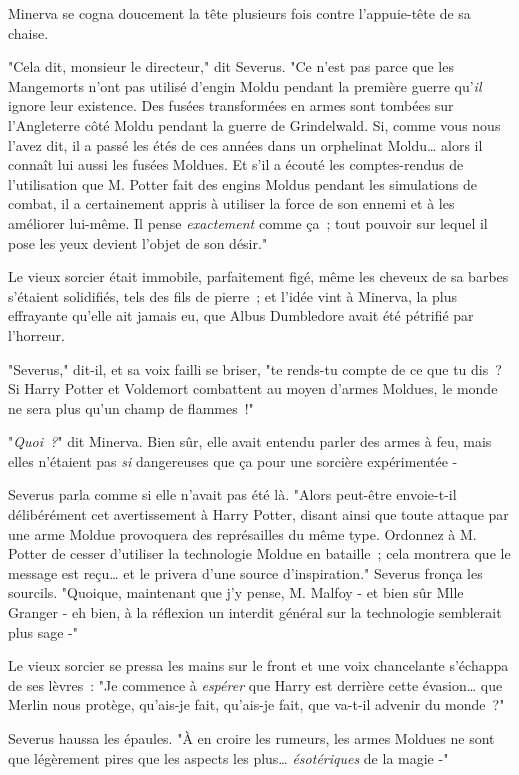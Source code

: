 Minerva se cogna doucement la tête plusieurs fois contre l'appuie-tête de sa chaise.

"Cela dit, monsieur le directeur," dit Severus. "Ce n'est pas parce que les Mangemorts n'ont pas utilisé d'engin Moldu pendant la première guerre qu'\emph{il} ignore leur existence. Des fusées transformées en armes sont tombées sur l'Angleterre côté Moldu pendant la guerre de Grindelwald. Si, comme vous nous l'avez dit, il a passé les étés de ces années dans un orphelinat Moldu… alors il connaît lui aussi les fusées Moldues. Et s'il a écouté les comptes-rendus de l'utilisation que M. Potter fait des engins Moldus pendant les simulations de combat, il a certainement appris à utiliser la force de son ennemi et à les améliorer lui-même. Il pense \emph{exactement} comme ça~; tout pouvoir sur lequel il pose les yeux devient l'objet de son désir."

Le vieux sorcier était immobile, parfaitement figé, même les cheveux de sa barbes s'étaient solidifiés, tels des fils de pierre~; et l'idée vint à Minerva, la plus effrayante qu'elle ait jamais eu, que Albus Dumbledore avait été pétrifié par l'horreur.

"Severus," dit-il, et sa voix failli se briser, "te rends-tu compte de ce que tu dis~? Si Harry Potter et Voldemort combattent au moyen d'armes Moldues, le monde ne sera plus qu'un champ de flammes~!"

"\emph{Quoi~?}" dit Minerva. Bien sûr, elle avait entendu parler des armes à feu, mais elles n'étaient pas \emph{si} dangereuses que ça pour une sorcière expérimentée -

Severus parla comme si elle n'avait pas été là. "Alors peut-être envoie-t-il délibérément cet avertissement à Harry Potter, disant ainsi que toute attaque par une arme Moldue provoquera des représailles du même type. Ordonnez à M. Potter de cesser d'utiliser la technologie Moldue en bataille~; cela montrera que le message est reçu… et le privera d'une source d'inspiration." Severus fronça les sourcils. "Quoique, maintenant que j'y pense, M. Malfoy - et bien sûr Mlle Granger - eh bien, à la réflexion un interdit général sur la technologie semblerait plus sage -"

Le vieux sorcier se pressa les mains sur le front et une voix chancelante s'échappa de ses lèvres~: "Je commence à \emph{espérer} que Harry est derrière cette évasion… que Merlin nous protège, qu'ais-je fait, qu'ais-je fait, que va-t-il advenir du monde~?"

Severus haussa les épaules. "À en croire les rumeurs, les armes Moldues ne sont que légèrement pires que les aspects les plus… \emph{ésotériques} de la magie -"

